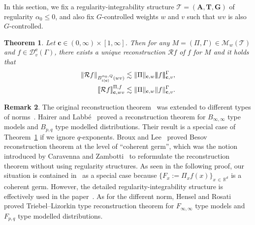 \documentclass[10pt]{amsart}
\newtheorem{theo}{Theorem}[section]
\theoremstyle{definition}
\newtheorem{rema}[theo]{Remark}
\numberwithin{equation}{section}
\newcommand{\bbR}{\mathbb{R}}
\newcommand{\bfc}{\mathbf{c}}
\newcommand{\bfA}{\mathbf{A}}
\newcommand{\bfT}{\mathbf{T}}
\newcommand{\bfG}{\mathbf{G}}
\newcommand{\mcD}{\mathcal{D}}
\newcommand{\mcR}{\mathcal{R}}
\newcommand{\scT}{\mathscr{T}}
\newcommand{\scM}{\mathscr{M}}
\newcommand{\tri}{|\!|\!|}
\newcommand{\llbracket}{\mathopen{[\mkern -2.7mu[}}
\newcommand{\rrbracket}{\mathclose{]\mkern -2.7mu]}}
\newcommand{\lb}{\llbracket}
\newcommand{\rb}{\rrbracket}
\begin{document}
In this section, we fix a regularity-integrability structure $\scT=(\bfA,\bfT,\bfG)$ of regularity $\alpha_0\le0$, and also fix $G$-controlled weights $w$ and $v$ such that $wv$ is also $G$-controlled.
\begin{theo}\label{thm:besovreconstruction}
Let $\bfc\in(0,\infty)\times[1,\infty]$. Then for any $M=(\Pi,\Gamma)\in\scM_{w}(\scT)$ and $f\in\mcD_{v}^\bfc(\Gamma)$, there exists a unique reconstruction $\mcR f$ of $f$ for $M$ and it holds that
\begin{align}\label{besovreconstruction}
\|\mcR f\|_{B_{i(\bfc)}^{\alpha_0,Q}(wv)}&\lesssim\|\Pi\|_{\bfc,w}\tri f\tri_{\bfc,v}^\Gamma,\\\label{besovreconstructioncharacterize}
\lb\mcR f\rb_{\bfc,wv}^{\Pi,f}&\lesssim \|\Pi\|_{\bfc,w}\|f\|_{\bfc,v}^\Gamma.
\end{align}
\end{theo}
\begin{rema}
The original reconstruction theorem~\cite[Theorem~3.10]{Hai14} was extended to different types of norms~\cite{BL22,HL17, HR20}. Hairer and Labbé~\cite{HL17} proved a reconstruction theorem for $B_{\infty,\infty}$ type models and $B_{p,q}$ type modelled distributions. Their result is a special case of Theorem~\ref{thm:besovreconstruction} if we ignore $q$-exponents. Broux and Lee~\cite{BL22} proved Besov reconstruction theorem at the level of ``coherent germ'', which was the notion introduced by Caravenna and Zambotti~\cite{CZ20} to reformulate the reconstruction theorem without using regularity structures. As seen in the following proof, our situation is contained in~\cite{BL22} as a special case because $\{F_x:=\Pi_xf(x)\}_{x\,\in\,\bbR^d}$ is a coherent germ. However, the detailed regularity-integrability structure is effectively used in the paper~\cite{BPHZ}. As for the different norm, Hensel and Rosati~\cite{HR20} proved Triebel--Lizorkin type reconstruction theorem for $F_{\infty,\infty}$ type models and $F_{p,q}$ type modelled distributions.
\end{rema}
\end{document}
